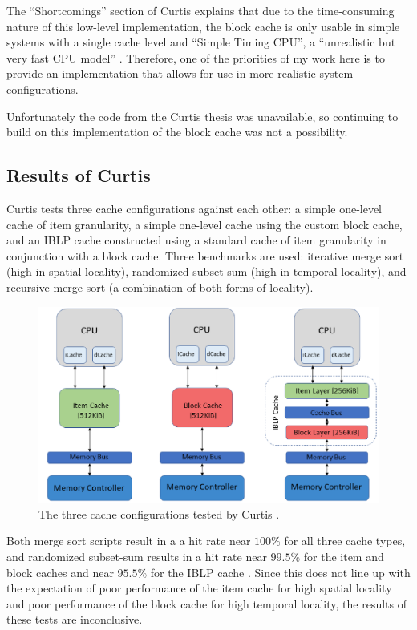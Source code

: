 \documentclass[12pt,twoside]{reedthesis}
\begin{document}
	The ``Shortcomings'' section of Curtis explains that due to the time-consuming nature of this low-level implementation, the block cache is only usable in simple systems with a single cache level and ``Simple Timing CPU'', a ``unrealistic but very fast CPU model'' \cite{curtis}. Therefore, one of the priorities of my work here is to provide an implementation that allows for use in more realistic system configurations.

	Unfortunately the code from the Curtis thesis was unavailable, so continuing to build on this implementation of the block cache was not a possibility.

	\subsection*{Results of Curtis}

	Curtis tests three cache configurations against each other: a simple one-level cache of item granularity, a simple one-level cache using the custom block cache, and an IBLP cache constructed using a standard cache of item granularity in conjunction with a block cache. Three benchmarks are used: iterative merge sort (high in spatial locality), randomized subset-sum (high in temporal locality), and recursive merge sort (a combination of both forms of locality).
	
	\begin{figure}[h]
		\centering
		\includegraphics[width=5in]{figures/curtis_caches.png}
		\caption{The three cache configurations tested by Curtis \cite{curtis}.}
	\end{figure}

	Both merge sort scripts result in a a hit rate near $100\%$ for all three cache types, and randomized subset-sum results in a hit rate near $99.5\%$ for the item and block caches and near $95.5\%$ for the IBLP cache \cite{curtis}. Since this does not line up with the expectation of poor performance of the item cache for high spatial locality and poor performance of the block cache for high temporal locality, the results of these tests are inconclusive.
\end{document}
